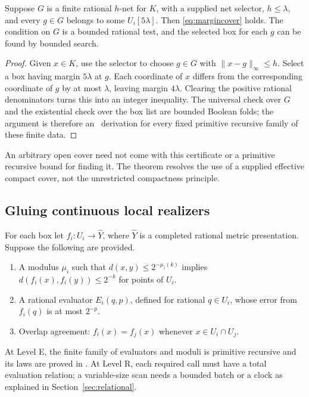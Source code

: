 \begin{lemma}\label{lem:margin-net}
Suppose $G$ is a finite rational $h$-net for $K$, with a supplied net selector,
$h\le\lambda$, and every $g\in G$ belongs to some $U_i[5\lambda]$.
Then \eqref{eq:margincover} holds. The condition on $G$ is a bounded rational
test, and the selected box for each $g$ can be found by bounded search.
\end{lemma}

\begin{proof}
Given $x\in K$, use the selector to choose $g\in G$ with
$\|x-g\|_\infty\le h$. Select a box having margin $5\lambda$ at $g$.
Each coordinate of $x$ differs from the corresponding coordinate of $g$ by
at most $\lambda$, leaving margin $4\lambda$. Clearing the positive rational
denominators turns this into an integer inequality. The universal check over
$G$ and the existential check over the box list are bounded Boolean folds;
the argument is therefore an \ipra\ derivation for every fixed primitive
recursive family of these finite data.
\end{proof}

An arbitrary open cover need not come with this certificate or a primitive
recursive bound for finding it. The theorem resolves the use of a supplied
effective compact cover, not the unrestricted compactness principle.

\subsection{Gluing continuous local realizers}

For each box let $f_i:U_i\to\widehat Y$, where $\widehat Y$ is a completed
rational metric presentation. Suppose the following are provided.

\begin{enumerate}
\item A modulus $\mu_i$ such that $d(x,y)\le2^{-\mu_i(k)}$ implies
      $d(f_i(x),f_i(y))\le2^{-k}$ for points of $U_i$.
\item A rational evaluator $E_i(q,p)$, defined for rational $q\in U_i$,
      whose error from $f_i(q)$ is at most $2^{-p}$.
\item Overlap agreement: $f_i(x)=f_j(x)$ whenever $x\in U_i\cap U_j$.
\end{enumerate}
At Level E, the finite family of evaluators and moduli is primitive recursive
and its laws are proved in \ipra. At Level R, each required call must have a
total evaluation relation; a variable-size scan needs a bounded batch or a
clock as explained in Section~\ref{sec:relational}.

